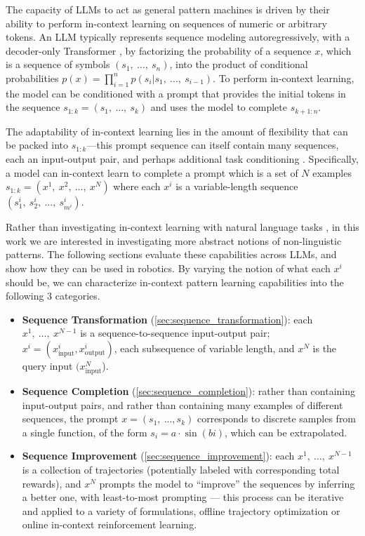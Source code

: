 The capacity of LLMs to act as general pattern machines is driven by their ability to perform in-context learning on sequences of numeric or arbitrary tokens.
An LLM typically represents sequence modeling autoregressively, with a decoder-only Transformer \cite{vaswani2017attention}, by factorizing the probability of a sequence $x$, which is a sequence of symbols $(s_1, \ \ldots, \ s_n)$, into the product of conditional probabilities $p(x)=\prod_{i=1}^{n}p(s_i|s_1, \ ...,\ s_{i-1})$.
To perform in-context learning, the model can be conditioned with a prompt that provides the initial tokens in the sequence $s_{1:k} = (s_1, \ \ldots, \ s_k)$ and uses the model to complete $s_{k+1:n}$.

The adaptability of in-context learning lies in the amount of flexibility that can be packed into $s_{1:k}$---this prompt sequence can itself contain many sequences, each an input-output pair, and perhaps additional task conditioning  \cite{radford2019language,min2022rethinking}.  Specifically, a model can in-context learn to complete a prompt which is a set of $N$ examples $s_{1:k} =(x^{1}, \ x^{2}, \ \ldots, \ x^{N})$ where each $x^{i}$ is a variable-length sequence $(s^{i}_1, \ s^{i}_2, \ ..., \ s^{i}_{m^i})$.

Rather than investigating in-context learning with natural language tasks \cite{brown2020language}, in this work we are interested in investigating more abstract notions of non-linguistic patterns.
The following sections evaluate these capabilities across LLMs, and show how they can be used in robotics. By varying the notion of what each $x^{i}$ should be, we can characterize in-context pattern learning capabilities into the following 3 categories. 
\begin{itemize}[leftmargin=*, topsep=0pt,itemsep=0ex,partopsep=1ex,parsep=1ex]
  \item \textbf{Sequence Transformation} (\cref{sec:sequence_transformation}): each $x^{1}, \ \ldots, \ x^{N-1}$ is a sequence-to-sequence input-output pair; \ie %
  $x^{i} = (x^{i}_{\text{input}}, x^{i}_{\text{output}})$, each subsequence of variable length, %
  and $x^{N}$ is the query input $(x^N_{\text{input}}$).
  \item \textbf{Sequence Completion} (\cref{sec:sequence_completion}): rather than containing input-output pairs, and rather than containing many examples of different sequences, the prompt $x = (s_1, \ ..., s_k)$ corresponds to discrete samples from a single function, \eg of the form $s_i = a \cdot \sin(bi)$, which can be extrapolated.
  \item \textbf{Sequence Improvement} (\cref{sec:sequence_improvement}): each $x^{1}, \ \ldots, \ x^{N-1}$ is a collection of trajectories (potentially labeled with corresponding total rewards), and  $x^{N}$ prompts the model to ``improve'' the sequences by inferring a better one, \eg with least-to-most prompting \cite{zhou2022least}---%
  this process can be iterative and applied to a variety of formulations, \eg offline trajectory optimization or online in-context reinforcement learning.
\end{itemize}

